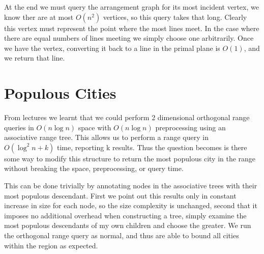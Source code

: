\documentclass{article}
\begin{document}
At the end we must query the arrangement graph for its most incident vertex, we know ther are at most $O(n^2)$ vertices, so this query takes that long.
Clearly this vertex must represent the point where the most lines meet.
In the case where there are equal numbers of lines meeting we simply choose one arbitrarily.
Once we have the vertex, converting it back to a line in the primal plane is $O(1)$, and we return that line.

\section {Populous Cities}

From lectures we learnt that we could perform 2 dimensional orthogonal range queries in $O(n \log n)$ space with $O(n \log n)$ preprocessing using an associative range tree.
This allows us to perform a range query in $O(\log^2 n + k)$ time, reporting k results.
Thus the question becomes is there some way to modify this structure to return the most populous city in the range without breaking the space, preprocessing, or query time.

This can be done trivially by annotating nodes in the associative trees with their most populous descendant.
First we point out this results only in constant increase in size for each node, so the size complexity is unchanged, second that it imposes no additional overhead when constructing a tree, simply examine the most populous descendants of my own children and choose the greater.
We run the orthogonal range query as normal, and thus are able to bound all cities within the region as expected.
\end{document}

